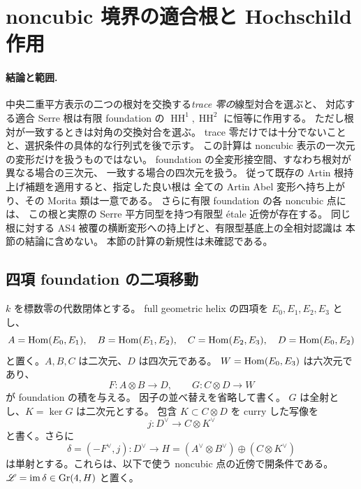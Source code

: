 \section{noncubic 境界の適合根と Hochschild 作用}
\label{sec:noncubic-hh-roots}


\paragraph{結論と範囲.}
中央二重平方表示の二つの根対を交換する\emph{trace 零の}線型対合を選ぶと、
対応する適合 Serre 根は有限 foundation の $\operatorname{HH}^1,\operatorname{HH}^2$ に恒等に作用する。
ただし根対が一致するときは対角の交換対合を選ぶ。
trace 零だけでは十分でないことと、選択条件の具体的な行列式を後で示す。
この計算は noncubic 表示の一次元の変形だけを扱うものではない。
foundation の全変形接空間、すなわち根対が異なる場合の三次元、
一致する場合の四次元を扱う。
従って既存の Artin 根持上げ補題を適用すると、指定した良い根は
全ての Artin Abel 変形へ持ち上がり、その Morita 類は一意である。
さらに有限 foundation の各 noncubic 点には、
この根と実際の Serre 平方同型を持つ有限型 étale 近傍が存在する。
同じ根に対する AS4 被覆の横断変形への持上げと、有限型基底上の全相対認識は
本節の結論に含めない。
本節の計算の新規性は未確認である。

\subsection{四項 foundation の二項移動}

$k$ を標数零の代数閉体とする。
full geometric helix の四項を $E_0,E_1,E_2,E_3$ とし、
\[
A=\operatorname{Hom}(E_0,E_1),\quad B=\operatorname{Hom}(E_1,E_2),\quad
C=\operatorname{Hom}(E_2,E_3),\quad D=\operatorname{Hom}(E_0,E_2)
\]
と置く。$A,B,C$ は二次元、$D$ は四次元である。
$W=\operatorname{Hom}(E_0,E_3)$ は六次元であり、
\[
F:A\otimes B\longrightarrow D,\qquad
G:C\otimes D\longrightarrow W
\]
が foundation の積を与える。
因子の並べ替えを省略して書く。
$G$ は全射とし、$K=\ker G$ は二次元とする。
包含 $K\subset C\otimes D$ を curry した写像を
\[
j:D^{\vee}\longrightarrow C\otimes K^{\vee}
\]
と書く。さらに
\begin{equation}\label{eq:nchh-delta}
\delta=(-F^{\vee},j):D^{\vee}\longrightarrow
H=(A^{\vee}\otimes B^{\vee})\oplus(C\otimes K^{\vee})
\end{equation}
は単射とする。これらは、以下で使う noncubic 点の近傍で開条件である。
$\mathscr L=\operatorname{im}\delta\in\operatorname{Gr}(4,H)$ と置く。

